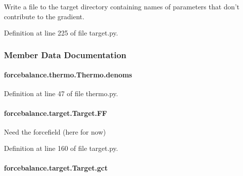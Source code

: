 Write a file to the target directory containing names of parameters that don't contribute to the gradient. 



Definition at line 225 of file target.\-py.



\subsubsection{Member Data Documentation}
\hypertarget{classforcebalance_1_1thermo_1_1Thermo_a2cfee647c0b5b8dd9f575d3a5d0b7d88}{
\paragraph[{denoms}]{\setlength{\rightskip}{0pt plus 5cm}forcebalance.\-thermo.\-Thermo.\-denoms}}\label{classforcebalance_1_1thermo_1_1Thermo_a2cfee647c0b5b8dd9f575d3a5d0b7d88}


Definition at line 47 of file thermo.\-py.

\hypertarget{classforcebalance_1_1target_1_1Target_a38a37919783141ea37fdcf8b00ce0aaf}{
\paragraph[{F\-F}]{\setlength{\rightskip}{0pt plus 5cm}forcebalance.\-target.\-Target.\-F\-F\hspace{0.3cm}{\ttfamily [inherited]}}}\label{classforcebalance_1_1target_1_1Target_a38a37919783141ea37fdcf8b00ce0aaf}


Need the forcefield (here for now) 



Definition at line 160 of file target.\-py.

\hypertarget{classforcebalance_1_1target_1_1Target_aa625ac88c6744eb14ef281d9496d0dbb}{
\paragraph[{gct}]{\setlength{\rightskip}{0pt plus 5cm}forcebalance.\-target.\-Target.\-gct\hspace{0.3cm}{\ttfamily [inherited]}}}\label{classforcebalance_1_1target_1_1Target_aa625ac88c6744eb14ef281d9496d0dbb}


